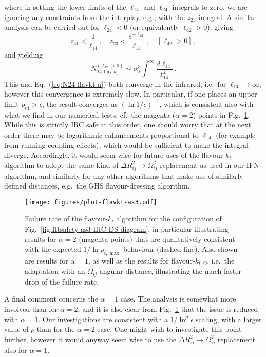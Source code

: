 \documentclass[nofootinbib,twocolumn,preprintnumbers,superscriptaddress,aps]{revtex4-2}
\newcommand{\as}{\alpha_s}
\newcommand{\lnptmax}{\ln p_{t,\max}}
\begin{document}
where in setting the lower limits of the $\ell_{14}$ and $\ell_{24}$
integrals to zero, we are ignoring any constraints from the interplay, e.g.,
with the $z_{23}$ integral.
%
A similar analysis can be carried out for $\ell_{24} < 0$ (or
equivalently $\ell_{42}>0$), giving 
\begin{equation}
  z_{41} < \frac{1}{\ell_{14}}\,,
  \quad
  z_{23} < \frac{e^{-\ell_{42}}}{\ell_{14}}\,,
  \quad
   [\ell_{42} > 0]\,,
\end{equation}
and yielding
\begin{equation}
  \label{eq:N24-flavkt-b}
  N_{24,\text{flav-}k_t}^{(\ell_{42}>0)}
  \sim \as^3 \int^\infty \frac{d\ell_{14}}{\ell_{14}^2}\,.
\end{equation}
This and Eq.~(\ref{eq:N24-flavkt-a}) both converge in the infrared,
i.e.\ for $\ell_{14} \to \infty$, however this convergence is
extremely slow.
%
In particular, if one places an upper limit $p_{t4} > \epsilon$, the
result converges as $(\ln 1/\epsilon)^{-1}$, which is consistent also
with what we find in our numerical tests, cf.\ the magenta
($\alpha=2$) points in Fig.~\ref{fig:flavkt-IHC-DS-rate}.
%
While this is strictly IRC safe at this order, one should worry that
at the next order there may be logarithmic enhancements proportional
to $\ell_{14}$ (for example from running-coupling effects), which
would be sufficient to make the integral diverge.
%
Accordingly, it would seem wise for future uses of the flavour-$k_t$
algorithm to
adopt the same kind of $\Delta R_{ij}^2 \to \Omega_{ij}^2$ replacement
as used in our IFN algorithm, and similarly for any other algorithms
that make use of similarly defined distances, e.g.\ the GHS
flavour-dressing algorithm.

\begin{figure}
  \centering
  \texttt{[image: figures/plot-flavkt-as3.pdf]}
  \caption{Failure rate of the flavour-$k_t$ algorithm 
    for the configuration of 
    Fig.~\ref{fig:IRsafety-as3-IHC-DS-diagram}, in particular illustrating 
    results for $\alpha=2$ (magenta points) that are qualitatively
    consistent with the expected $1/\lnptmax$ behaviour 
    (dashed line).
  Also shown are results for $\alpha=1$, as well as the results for
  flavour-$k_{t,\Omega}$, i.e.\ the adaptation with an $\Omega_{ij}$ angular
    distance, illustrating the much faster drop of the failure rate.
   }
  \label{fig:flavkt-IHC-DS-rate}
\end{figure}

A final comment concerns the $\alpha=1$ case.
%
The analysis is somewhat more involved than for $\alpha=2$, and it is
also clear from Fig.~\ref{fig:flavkt-IHC-DS-rate} that the issue is
reduced with $\alpha=1$.
%
Our investigations are consistent with a $1/\ln^p \epsilon$ scaling,
with a larger value of $p$ than for the $\alpha=2$  case.
%
One might wish to investigate this point further, however it would
anyway seem wise to use the $\Delta R_{ij}^2 \to \Omega_{ij}^2$
replacement also for $\alpha=1$.
\end{document}
